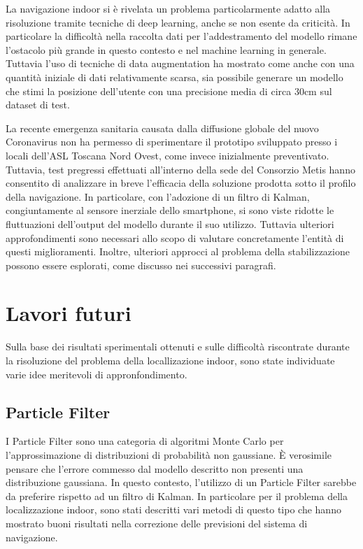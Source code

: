 
La navigazione indoor si è rivelata un problema particolarmente adatto alla
risoluzione tramite tecniche di deep learning, anche se non esente da
criticità. In particolare la difficoltà nella raccolta dati per l'addestramento
del modello rimane l'ostacolo più grande in questo contesto e nel machine
learning in generale. Tuttavia l'uso di tecniche di data augmentation ha
mostrato come anche con una quantità iniziale di dati relativamente scarsa, sia
possibile generare un modello che stimi la posizione dell'utente con una
precisione media di circa 30cm sul dataset di test.

La recente emergenza sanitaria causata dalla diffusione globale del nuovo
Coronavirus non ha permesso di sperimentare il prototipo sviluppato presso i
locali dell'ASL Toscana Nord Ovest, come invece inizialmente preventivato.
Tuttavia, test pregressi effettuati all'interno della sede del Consorzio Metis
hanno consentito di analizzare in breve l'efficacia della soluzione prodotta
sotto il profilo della navigazione. In particolare, con l'adozione di un filtro
di Kalman, congiuntamente al sensore inerziale dello smartphone, si sono viste
ridotte le fluttuazioni dell'output del modello durante il suo utilizzo.
Tuttavia ulteriori approfondimenti sono necessari allo scopo di valutare
concretamente l'entità di questi miglioramenti. Inoltre, ulteriori approcci al
problema della stabilizzazione possono essere esplorati, come discusso nei
successivi paragrafi.
\section{Lavori futuri}
Sulla base dei risultati sperimentali ottenuti e sulle difficoltà riscontrate
durante la risoluzione del problema della locallizazione indoor, sono state
individuate varie idee meritevoli di appronfondimento.
\subsection{Particle Filter}
I Particle Filter sono una categoria di algoritmi Monte Carlo per
l'approssimazione di distribuzioni di probabilità non gaussiane. È verosimile
pensare che l'errore commesso dal modello descritto non presenti una
distribuzione gaussiana. In questo contesto, l'utilizzo di un Particle Filter
sarebbe da preferire rispetto ad un filtro di Kalman. In particolare per il
problema della localizzazione indoor, sono stati descritti vari metodi di
questo tipo che hanno mostrato buoni risultati nella correzione delle
previsioni del sistema di navigazione\cite{particle-filter1, particle-filter2}.
